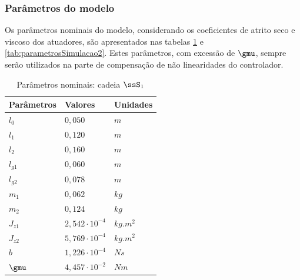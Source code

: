 \documentclass[]{politex}
\begin{document}
\subsubsection{Parâmetros do modelo}

Os parâmetros nominais do modelo, considerando os coeficientes de atrito seco e viscoso dos atuadores, são apresentados nas tabelas \ref{tab:parametrosSimulacao1} e \ref{tab:parametrosSimulacao2}. Estes parâmetros, com excessão de $\gmu$, sempre serão utilizados na parte de compensação de não linearidades do controlador. 
\begin{multicols}{2}
\begin{table}[H] 
\centering
\caption{Parâmetros nominais: cadeia $\ssS_1$}
\label{tab:parametrosSimulacao1}
\begin{tabular}{l|l|l}
Parâmetros   & Valores                  & Unidades      \\ \hline
$l_0$        & $0{,}050$                     & $m$        \\
$l_1$        & $0{,}120$                     & $m$        \\
$l_2$        & $0{,}160$                     & $m$        \\
$l_{g1}$     & $0{,}060$                     & $m$        \\
$l_{g2}$     & $0{,}078$                     & $m$        \\
$m_1$        & $0{,}062$                     & $kg$       \\
$m_2$        & $0{,}124$                     & $kg$       \\
$J_{z1}$     & $2{,}542 \cdot 10^{-4}$       & $kg.m^{2}$ \\
$J_{z2}$     & $5{,}769 \cdot 10^{-4}$       & $kg.m^{2}$ \\
$b$          & $1{,}226 \cdot 10^{-4}$       & $N s$      \\
$\gmu$       & $4{,}457 \cdot 10^{-2}$       & $Nm$        \\
\end{tabular}
\end{table}


\end{multicols}
\end{document}
